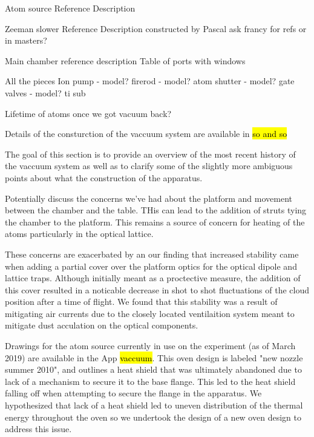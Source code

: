 Atom source
	Reference
	Description
	
	
Zeeman slower
	Reference
	Description
		constructed by Pascal
		ask francy for refs or in masters?
		
Main chamber
	reference
	description
	Table of ports with windows
	
All the pieces
	Ion pump - model?
	firerod - model?
	atom shutter - model?
	gate valves - model?
	ti sub
	
	
	
	
Lifetime of atoms once we got vacuum back?

Details of the consturction of the vaccuum system are available in \hl{so and so}

The goal of this section is to provide an overview of the most recent history of the vaccuum system as well as to clarify some of the slightly more ambiguous points about what the construction of the apparatus.

Potentially discuss the concerns we've had about the platform and movement between the chamber and the table. THis can lead to the addition of struts tying the chamber to the platform. This remains a source of concern for heating of the atoms particularly in the optical lattice. 

These concerns are exacerbated by an our finding that increased stability came when adding a partial cover over the platform optics for the optical dipole and lattice traps. Although initially meant as a proctective measure, the addition of this cover resulted in a noticable decrease in shot to shot fluctuations of the cloud position after a time of flight. We found that this stability was a result of mitigating air currents due to the closely located ventilaition system meant to mitigate dust acculation on the optical components.

Drawings for the atom source currently in use on the experiment (as of March 2019) are available in the App \hl{vaccuum}. This oven design is labeled "new nozzle summer 2010", and outlines a heat shield that was ultimately abandoned due to lack of a mechanism to secure it to the base flange. This led to the heat shield falling off when attempting to secure the flange in the apparatus. We hypothesized that lack of a heat shield led to uneven distribution of the thermal energy throughout the oven so we undertook the design of a new oven design to address this issue.

